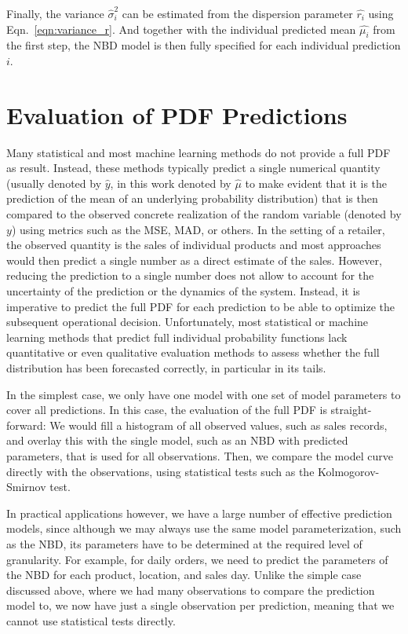 \documentclass[BCOR=1mm, DIV=calc,10pt,
twoside=true,
twocolumn,
headings=normal]{scrartcl}
\newcommand{\eqn}{Eqn.~}
\begin{document}
Finally, the variance $\hat{\sigma}^2_i$ can be estimated from the dispersion parameter $\hat{r_i}$ using \eqn \eqref{eqn:variance_r}. And together with the individual predicted mean $\hat{\mu_i}$ from the first step, the NBD model is then fully specified for each individual prediction $i$.


\section{Evaluation of PDF Predictions}
\label{sec:pdfEvaluation}

Many statistical and most machine learning methods do not provide a full PDF as result. Instead, these methods typically predict a single numerical quantity (usually denoted by $\hat{y}$, in this work denoted by $\hat{\mu}$ to make evident that it is the prediction of the mean of an underlying probability distribution) that is then compared to the observed concrete realization of the random variable (denoted by $y$) using metrics such as the MSE, MAD, or others. In the setting of a retailer, the observed quantity is the sales of individual products and most approaches would then predict a single number as a direct estimate of the sales. However, reducing the prediction to a single number does not allow to account for the uncertainty of the prediction or the dynamics of the system. Instead, it is imperative to predict the full PDF for each prediction to be able to optimize the subsequent operational decision. Unfortunately, most statistical or machine learning methods that predict full individual probability functions lack quantitative or even qualitative evaluation methods to assess whether the full distribution has been forecasted correctly, in particular in its tails.

In the simplest case, we only have one model with one set of model parameters to cover all predictions. In this case, the evaluation of the full PDF is straight-forward: We would fill a histogram of all observed values, such as sales records, and overlay this with the single model, such as an NBD with predicted parameters, that is used for all observations. Then, we compare the model curve directly with the observations, using statistical tests such as the Kolmogorov-Smirnov test.

In practical applications however, we have a large number of effective prediction models, since although we may always use the same model parameterization, such as the NBD, its parameters have to be determined at the required level of granularity. For example, for daily orders, we need to predict the parameters of the NBD for each product, location, and sales day. Unlike the simple case discussed above, where we had many observations to compare the prediction model to, we now have just a single observation per prediction, meaning that we cannot use statistical tests directly.
\end{document}
